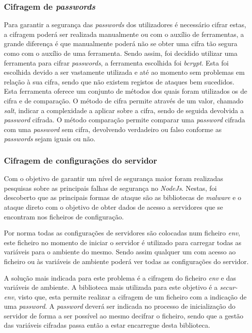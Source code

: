 \subsubsection{Cifragem de \textit{passwords}}
Para garantir a segurança das \textit{passwords} dos utilizadores é necessário cifrar estas, a cifragem poderá ser realizada manualmente ou com o auxílio de ferramentas, a grande diferença é que manualmente poderá não se obter uma cifra tão segura como com o auxílio de uma ferramenta. Sendo assim, foi decidido utilizar uma ferramenta para cifrar \textit{passwords}, a ferramenta escolhida foi \textit{bcrypt}. Esta foi escolhida devido a ser vastamente utilizada e até ao momento sem problemas em relação à sua cifra, sendo que não existem registos de ataques bem sucedidos. Esta ferramenta oferece um conjunto de métodos dos quais foram utilizados os de cifra e de comparação. O método de cifra permite através de um valor, chamado \textit{salt}, indicar a complexidade a aplicar sobre a cifra, sendo de seguida devolvida a \textit{\textit{password}} cifrada. O método comparação permite comparar uma \textit{\textit{password}} cifrada com uma \textit{\textit{password}} sem cifra, devolvendo verdadeiro ou falso conforme as \textit{passwords} sejam iguais ou não.

\subsubsection{Cifragem de configurações do servidor}
Com o objetivo de garantir um nível de segurança maior foram realizadas pesquisas sobre as principais falhas de segurança no \textit{NodeJs}. Nestas, foi descoberto que as principais formas de ataque são as bibliotecas de \textit{malware} e o ataque direto com o objetivo de obter dados de acesso a servidores que se encontram nos ficheiros de configuração.

Por norma todas as configurações de servidores são colocadas num ficheiro \textit{env}, este ficheiro no momento de iniciar o servidor é utilizado para carregar todas as variáveis para o ambiente do mesmo. Sendo assim qualquer um com acesso ao ficheiro ou às variáveis de ambiente poderá ver todas as configurações do servidor.

A solução mais indicada para este problema é a cifragem do ficheiro \textit{env} e das variáveis de ambiente. A biblioteca mais utilizada para este objetivo é a \textit{secur-env}, visto que, esta permite realizar a cifragem de um ficheiro com a indicação de uma \textit{\textit{password}}. A \textit{\textit{password}} deverá ser indicada no processo de inicialização do servidor de forma a ser possível ao mesmo decifrar o ficheiro, sendo que a gestão das variáveis cifradas passa então a estar encarregue desta biblioteca.

